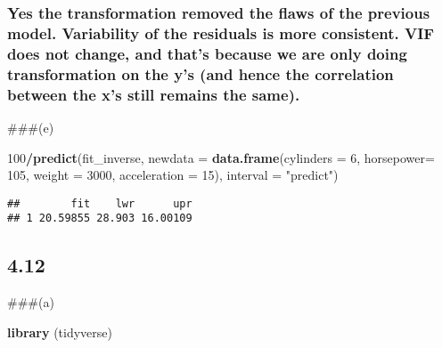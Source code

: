 \documentclass[
]{article}
\newenvironment{Shaded}{\begin{snugshade}}{\end{snugshade}}
\newcommand{\DataTypeTok}[1]{\textcolor[rgb]{0.13,0.29,0.53}{#1}}
\newcommand{\DecValTok}[1]{\textcolor[rgb]{0.00,0.00,0.81}{#1}}
\newcommand{\KeywordTok}[1]{\textcolor[rgb]{0.13,0.29,0.53}{\textbf{#1}}}
\newcommand{\NormalTok}[1]{#1}
\newcommand{\OperatorTok}[1]{\textcolor[rgb]{0.81,0.36,0.00}{\textbf{#1}}}
\newcommand{\StringTok}[1]{\textcolor[rgb]{0.31,0.60,0.02}{#1}}
\begin{document}
\hypertarget{yes-the-transformation-removed-the-flaws-of-the-previous-model.-variability-of-the-residuals-is-more-consistent.-vif-does-not-change-and-thats-because-we-are-only-doing-transformation-on-the-ys-and-hence-the-correlation-between-the-xs-still-remains-the-same.}{%
\subsubsection{Yes the transformation removed the flaws of the previous
model. Variability of the residuals is more consistent. VIF does not
change, and that's because we are only doing transformation on the y's
(and hence the correlation between the x's still remains the
same).}\label{yes-the-transformation-removed-the-flaws-of-the-previous-model.-variability-of-the-residuals-is-more-consistent.-vif-does-not-change-and-thats-because-we-are-only-doing-transformation-on-the-ys-and-hence-the-correlation-between-the-xs-still-remains-the-same.}}

\#\#\#(e)

\begin{Shaded}
\begin{Highlighting}[]
\DecValTok{100}\OperatorTok{/}\KeywordTok{predict}\NormalTok{(fit_inverse, }\DataTypeTok{newdata =} \KeywordTok{data.frame}\NormalTok{(}\DataTypeTok{cylinders =} \DecValTok{6}\NormalTok{, }\DataTypeTok{horsepower=} \DecValTok{105}\NormalTok{, }\DataTypeTok{weight =} \DecValTok{3000}\NormalTok{, }\DataTypeTok{acceleration =} \DecValTok{15}\NormalTok{), }\DataTypeTok{interval =} \StringTok{"predict"}\NormalTok{)}
\end{Highlighting}
\end{Shaded}

\begin{verbatim}
##        fit    lwr      upr
## 1 20.59855 28.903 16.00109
\end{verbatim}

\hypertarget{section-2}{%
\subsection{4.12}\label{section-2}}

\#\#\#(a)

\begin{Shaded}
\begin{Highlighting}[]
\KeywordTok{library}\NormalTok{ (tidyverse)}
\end{Highlighting}
\end{Shaded}
\end{document}
